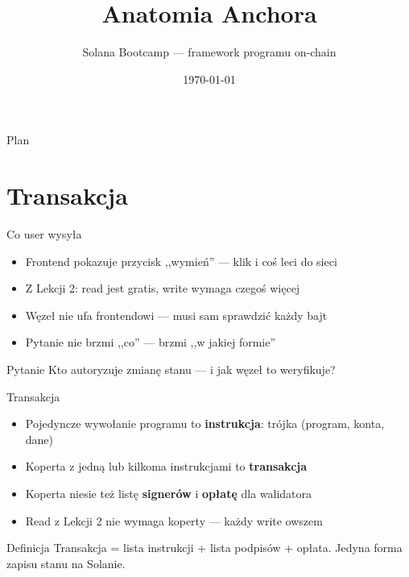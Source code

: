

\usepackage[utf8]{inputenc}
\usepackage[T1]{fontenc}

\title{Anatomia Anchora}
\subtitle{Solana Bootcamp --- framework programu on-chain}
\author{}
\date{\today}



\maketitleframe

\begin{frame}{Plan}
  \tableofcontents
\end{frame}

\section{Transakcja}

\begin{frame}{Co user wysyła}
  \begin{itemize}
    \item Frontend pokazuje przycisk ,,wymień'' --- klik i coś leci do sieci
    \item Z Lekcji 2: read jest gratis, write wymaga czegoś więcej
    \item Węzeł nie ufa frontendowi --- musi sam sprawdzić każdy bajt
    \item Pytanie nie brzmi ,,co'' --- brzmi ,,w jakiej formie''
  \end{itemize}
  \vspace{0.25cm}
  \begin{alertblock}{Pytanie}
    Kto autoryzuje zmianę stanu --- i jak węzeł to weryfikuje?
  \end{alertblock}
\end{frame}

\begin{frame}{Transakcja}
  \begin{itemize}
    \item Pojedyncze wywołanie programu to \textbf{instrukcja}: trójka (program, konta, dane)
    \item Koperta z jedną lub kilkoma instrukcjami to \textbf{transakcja}
    \item Koperta niesie też listę \textbf{signerów} i \textbf{opłatę} dla walidatora
    \item Read z Lekcji 2 nie wymaga koperty --- każdy write owszem
  \end{itemize}
  \vspace{0.25cm}
  \begin{block}{Definicja}
    Transakcja = lista instrukcji + lista podpisów + opłata.
    Jedyna forma zapisu stanu na Solanie.
  \end{block}
\end{frame}

